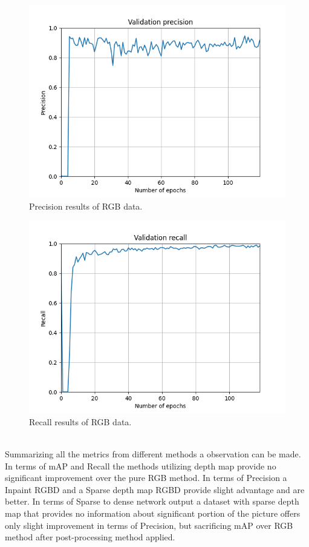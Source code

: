 \documentclass[twoside]{ctuthesis}
\theoremstyle{plain}
\theoremstyle{definition}
\theoremstyle{note}
\begin{document}
\begin{figure}[h!]
	\centering
	\includegraphics[width=\textwidth]{run-no_depth120e-tag-validation_precision.png}
	\caption{Precision results of RGB data.}
\end{figure}
\begin{figure}[h!]
	\centering
	\includegraphics[width=\textwidth]{run-no_depth120e-tag-validation_recall.png}
	\caption{Recall results of RGB data.}
\end{figure}
\pagebreak
\\
Summarizing all the metrics from different methods a observation can be made. In terms of mAP and Recall the methods utilizing depth map provide no significant improvement over the pure RGB method. In terms of Precision a Inpaint RGBD and a Sparse depth map RGBD provide slight advantage and are better. In terms of Sparse to dense network output a dataset with sparse depth map that provides no information about significant portion of the picture offers only slight improvement in terms of Precision, but sacrificing mAP over RGB method after post-processing method applied.  
\end{document}
